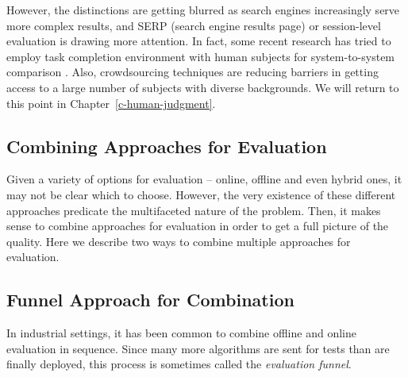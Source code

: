 However, the distinctions are getting blurred as search engines increasingly serve more complex results, and SERP (search engine results page) or session-level evaluation is drawing more attention. In fact, some recent research has tried to employ task completion environment with human subjects for system-to-system comparison \citep{Xu:2009}. Also, crowdsourcing techniques are reducing barriers in getting access to a large number of subjects with diverse backgrounds. We will return to this point in Chapter~\ref{c-human-judgment}.

\subsection{Combining Approaches for Evaluation}
Given a variety of options for evaluation -- online, offline and even hybrid ones, it may not be clear which to choose. However, the very existence of these different approaches predicate the multifaceted nature of the problem. Then, it makes sense to combine approaches for evaluation in order to get a full picture of the quality. Here we describe two ways to combine multiple approaches for evaluation.  %


\subsection{Funnel Approach for Combination}
In industrial settings, it has been common to combine offline and online evaluation in sequence. Since many more algorithms are sent for tests than are finally deployed, this process is sometimes called the \textit{evaluation funnel}. 

